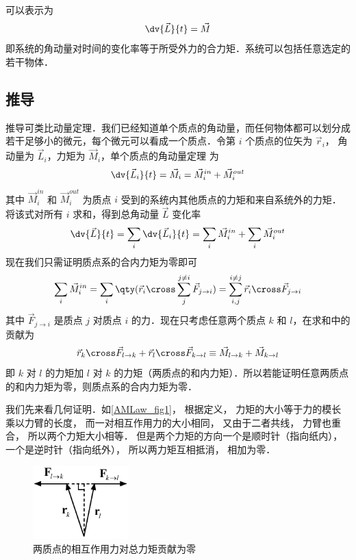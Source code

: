 
可以表示为
\begin{equation}\label{AMLaw_eq1}
\dv{\vec L}{t} = \vec M
\end{equation}
即系统的角动量对时间的变化率等于所受外力的合力矩．系统可以包括任意选定的若干物体．

\subsection{推导}
推导可类比动量定理．我们已经知道单个质点的角动量，而任何物体都可以划分成若干足够小的微元，每个微元可以看成一个质点．令第 $i$ 个质点的位矢为 $\vec r_i$， 角动量为 $\vec L_i$，力矩为 $\vec M_i$，单个质点的角动量定理 为
\begin{equation}
\dv{\vec L_i}{t} = \vec M_i = \vec M_i^{in} + \vec M_i^{out}
\end{equation}
其中 $\vec M_i^{in}$ 和 $\vec M_i^{out}$ 为质点 $i$ 受到的系统内其他质点的力矩和来自系统外的力矩．将该式对所有 $i$ 求和，得到总角动量 $\vec L$ 变化率
\begin{equation}
\dv{\vec L}{t} =\sum_i\dv{\vec L_i}{t} = \sum_i\vec M_i^{in} + \sum_i\vec M_i^{out}
\end{equation}
现在我们只需证明质点系的合内力矩为零即可
\begin{equation}
\sum_i\vec M_i^{in} = \sum_i \qty(\vec r_i\cross\sum_j^{j\ne i}\vec F_{j\to i}) = \sum_{i,j}^{i\ne j} \vec r_i\cross\vec F_{j\to i}
\end{equation}
其中 $\vec F_{j\to i}$ 是质点 $j$ 对质点 $i$ 的力．现在只考虑任意两个质点 $k$ 和 $l$，在求和中的贡献为
\begin{equation}
\vec r_k\cross\vec F_{l\to k} + \vec r_l\cross\vec F_{k\to l} \equiv \vec M_{l\to k}+ \vec M_{k\to l}
\end{equation}
即 $k$ 对 $l$ 的力矩加 $l$ 对 $k$ 的力矩（两质点的和内力矩）．所以若能证明任意两质点的和内力矩为零，则质点系的合内力矩为零．

我们先来看几何证明．如\autoref{AMLaw_fig1}， 根据定义， 力矩的大小等于力的模长乘以力臂的长度， 而一对相互作用力的大小相同， 又由于二者共线， 力臂也重合， 所以两个力矩大小相等． 但是两个力矩的方向一个是顺时针（指向纸内）， 一个是逆时针（指向纸外）， 所以两力矩互相抵消， 相加为零．

\begin{figure}[ht]
\centering
\includegraphics[width=3.7cm]{./figures/AMLaw1.pdf}
\caption{两质点的相互作用力对总力矩贡献为零}\label{AMLaw_fig1}
\end{figure}

